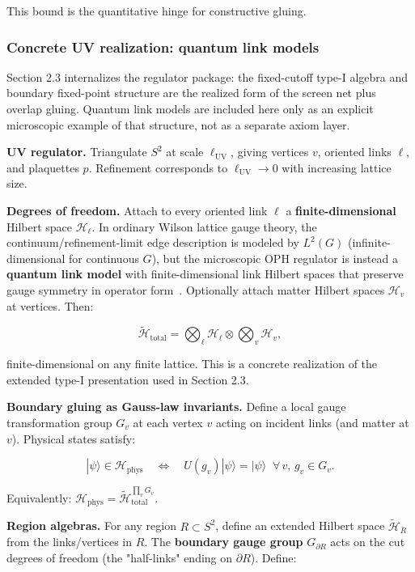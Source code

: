 This bound is the quantitative hinge for constructive gluing.

\subsubsection{Concrete UV realization: quantum link models}\label{26-concrete-uv-realization-quantum-link-models}

Section 2.3 internalizes the regulator package: the fixed-cutoff type-I algebra and boundary fixed-point structure are the realized form of the screen net plus overlap gluing. Quantum link models are included here only as an explicit microscopic example of that structure, not as a separate axiom layer.

\textbf{UV regulator.} Triangulate \(S^2\) at scale \(\ell_{\mathrm{UV}}\), giving vertices \(v\), oriented links \(\ell\), and plaquettes \(p\). Refinement corresponds to \(\ell_{\mathrm{UV}} \to 0\) with increasing lattice size.

\textbf{Degrees of freedom.} Attach to every oriented link \(\ell\) a \textbf{finite-dimensional} Hilbert space \(\mathcal{H}_\ell\). In ordinary Wilson lattice gauge theory, the continuum/refinement-limit edge description is modeled by \(L^2(G)\) (infinite-dimensional for continuous \(G\)), but the microscopic OPH regulator is instead a \textbf{quantum link model} with finite-dimensional link Hilbert spaces that preserve gauge symmetry in operator form~\cite{cw97}. Optionally attach matter Hilbert spaces \(\mathcal{H}_v\) at vertices. Then:

\[
\tilde{\mathcal{H}}_{\mathrm{total}} = \bigotimes_\ell \mathcal{H}_\ell \otimes \bigotimes_v \mathcal{H}_v,
\]

finite-dimensional on any finite lattice. This is a concrete realization of the extended type-I presentation used in Section 2.3.

\textbf{Boundary gluing as Gauss-law invariants.} Define a local gauge transformation group \(G_v\) at each vertex \(v\) acting on incident links (and matter at \(v\)). Physical states satisfy:

\[
|\psi\rangle \in \mathcal{H}_{\mathrm{phys}} \quad\Longleftrightarrow\quad U(g_v)|\psi\rangle = |\psi\rangle \;\;\forall\, v,\, g_v \in G_v.
\]

Equivalently: \(\mathcal{H}_{\mathrm{phys}} = \tilde{\mathcal{H}}_{\mathrm{total}}^{\prod_v G_v}\).

\textbf{Region algebras.} For any region \(R \subset S^2\), define an extended Hilbert space \(\tilde{\mathcal{H}}_R\) from the links/vertices in \(R\). The \textbf{boundary gauge group} \(G_{\partial R}\) acts on the cut degrees of freedom (the "half-links" ending on \(\partial R\)). Define:


